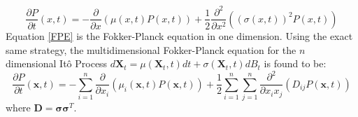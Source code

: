\begin{equation}
\label{FPE}
\frac{\partial P}{\partial t}(x,t) =-\frac{\partial}{\partial x}\left(\mu(x,t) P(x,t)\right) + \frac{1}{2}\frac{\partial^2}{\partial x^2}\left((\sigma(x,t))^2P(x,t)\right)
\end{equation}
Equation \eqref{FPE} is the Fokker-Planck equation in one dimension. Using the exact same strategy, the multidimensional Fokker-Planck equation for the $n$ dimensional It\^{o} Process $d\mathbf{X}_t = \mu(\mathbf{X}_t,t)dt + \sigma(\mathbf{X}_t,t)dB_t$ is found to be:
\begin{equation}
\label{FPE_ndim}
\frac{\partial P}{\partial t}(\mathbf{x},t) =-\sum\limits_{i=1}^{n}\frac{\partial}{\partial x_i}\left(\mu_i(\mathbf{x},t) P(\mathbf{x},t)\right) + \frac{1}{2}\sum\limits_{i=1}^{n}\sum\limits_{j=1}^{n}\frac{\partial^2}{\partial x_ix_j}\left(D_{ij}P(\mathbf{x},t)\right)
\end{equation}
where $\mathbf{D} = \mathbf{\sigma}\mathbf{\sigma}^T$.